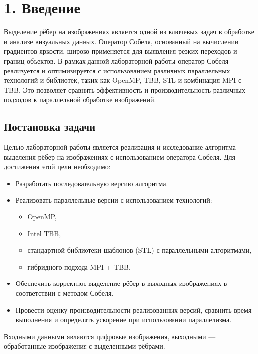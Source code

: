 \documentclass{report}
\begin{document}
\section*{1. Введение}

\justifying
Выделение рёбер на изображениях является одной из ключевых задач в обработке и анализе визуальных данных. Оператор Собеля, основанный на вычислении градиентов яркости, широко применяется для выявления резких переходов и границ объектов. В рамках данной лабораторной работы оператор Собеля реализуется и оптимизируется с использованием различных параллельных технологий и библиотек, таких как OpenMP, TBB, STL и комбинация MPI с TBB. Это позволяет сравнить эффективность и производительность различных подходов к параллельной обработке изображений.

\subsection*{Постановка задачи}

\justifying
Целью лабораторной работы является реализация и исследование алгоритма выделения рёбер на изображениях с использованием оператора Собеля. Для достижения этой цели необходимо:

\begin{itemize}
    \item Разработать последовательную версию алгоритма.
    \item Реализовать параллельные версии с использованием технологий:
    \begin{itemize}
        \item OpenMP,
        \item Intel TBB,
        \item стандартной библиотеки шаблонов (STL) с параллельными алгоритмами,
        \item гибридного подхода MPI + TBB.
    \end{itemize}
    \item Обеспечить корректное выделение рёбер в выходных изображениях в соответствии с методом Собеля.
    \item Провести оценку производительности реализованных версий, сравнить время выполнения и определить ускорение при использовании параллелизма.
\end{itemize}

Входными данными являются цифровые изображения, выходными — обработанные изображения с выделенными рёбрами.
\end{document}
